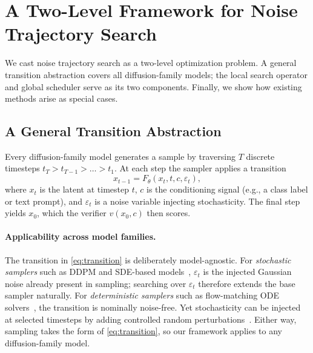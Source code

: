 \section{A Two-Level Framework for Noise Trajectory Search}
\label{sec:framework}

We cast noise trajectory search as a two-level optimization problem.
A general transition abstraction covers all diffusion-family models;
the local search operator and global scheduler serve as its two components.
Finally, we show how existing methods arise as special cases.

\subsection{A General Transition Abstraction}
\label{sec:transition}

Every diffusion-family model generates a sample by traversing
$T$ discrete timesteps $t_T > t_{T-1} > \dots > t_1$.
At each step the sampler applies a transition
\begin{equation}
  x_{t-1} = F_\theta(x_t, t, c, \varepsilon_t),
  \label{eq:transition}
\end{equation}
where $x_t$ is the latent at timestep $t$, $c$ is the conditioning signal
(e.g., a class label or text prompt), and $\varepsilon_t$ is a noise variable
injecting stochasticity.
The final step yields $x_0$, which the verifier $v(x_0, c)$ then scores.

\paragraph{Applicability across model families.}
The transition in \cref{eq:transition} is deliberately model-agnostic.
For \emph{stochastic samplers} such as DDPM and SDE-based
models~\citep{ho2020denoising,song2021scorebased}, $\varepsilon_t$ is the injected Gaussian noise already present in
sampling; searching over $\varepsilon_t$ therefore extends the base
sampler naturally.
For \emph{deterministic samplers} such as flow-matching ODE
solvers~\citep{lipman2023flow,liu2023flow}, the transition is nominally
noise-free.
Yet stochasticity can be injected at selected timesteps
by adding controlled random perturbations~\citep{dockhorn2024stochastic,kim2025rbf,black2023training,fan2024reinforcement}.
Either way, sampling takes the form of
\cref{eq:transition}, so our framework applies to any diffusion-family
model.


